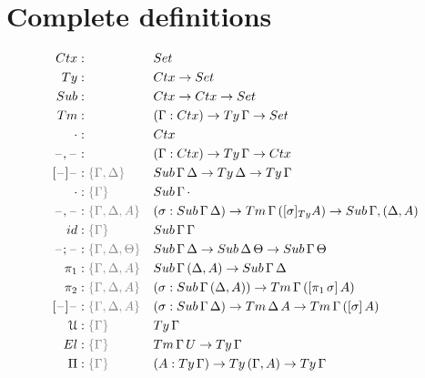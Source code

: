 \documentclass[a4paper,UKenglish,numberwithinsect,cleveref,thm-restate]{lipics-v2021}
\begin{document}
\section{Complete definitions}
\begin{alignat*}{3}
  \Ctx      & : && \Set                   \\
  \Ty       & : && \Ctx \to \Set          \\
  \Sub      & : && \Ctx \to \Ctx \to \Set \\
  \Tm       & : && (\Gamma : \Ctx) \to \Ty\,\Gamma \to \Set \\
  \emptyctx & : && \Ctx \\
  \blank,\blank & : && (\Gamma : \Ctx) \to \Ty\,\Gamma \to \Ctx \\
  [\blank]\blank & : \implicit{\Gamma, \Delta} && \Sub\,\Gamma\,\Delta \to \Ty\,\Delta \to \Ty\,\Gamma \\
  \emptysub & : \implicit{\Gamma} && \Sub\,\Gamma\,\emptyctx \\
  \blank,\blank & : \implicit{\Gamma, \Delta, A} && (\sigma : \Sub\,\Gamma\,\Delta) \to \Tm\,\Gamma\,([ \sigma ]_{\Ty} A) \to \Sub\,\Gamma,(\Delta, A) \\
  \idS & : \implicit{\Gamma} && \Sub\,\Gamma\,\Gamma \\
  \blank;\blank & : \implicit{\Gamma, \Delta, \Theta} && \Sub\,\Gamma\,\Delta \to \Sub\,\Delta\,\Theta \to \Sub\,\Gamma\,\Theta \\
  \pi_1 & : \implicit{\Gamma, \Delta, A} && \Sub\,\Gamma\,(\Delta, A) \to \Sub\,\Gamma\,\Delta \\
  \pi_2 & : \implicit{\Gamma, \Delta, A} && (\sigma : \Sub\,\Gamma\,(\Delta, A)) \to \Tm\,\Gamma\,([ \pi_1\,\sigma ]\, A) \\
  [\blank] \blank & : \implicit{\Gamma,\Delta, A} && (\sigma : \Sub\,\Gamma\,\Delta) \to \Tm\,\Delta\,A \to \Tm\,\Gamma\,([\sigma]\, A) \\
  \UU     & : \implicit{\Gamma} && \Ty\, \Gamma \\
  \El     & : \implicit{\Gamma} && \Tm\,\Gamma\,U \to \Ty\,\Gamma \\
  \Pi     & : \implicit{\Gamma} && (A : \Ty\,\Gamma) \to \Ty\,(\Gamma, A) \to \Ty\,\Gamma \\
\end{alignat*}
\end{document}
